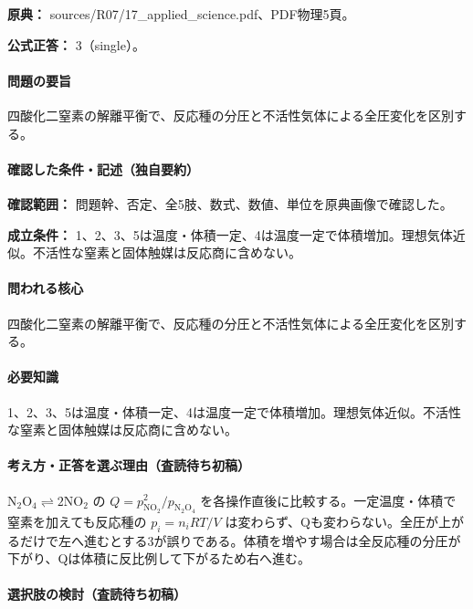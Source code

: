 \noindent\textbf{原典：} sources/R07/17\_applied\_science.pdf、PDF物理5頁。

\textbf{公式正答：} 3（single）。

\paragraph{問題の要旨} 四酸化二窒素の解離平衡で、反応種の分圧と不活性気体による全圧変化を区別する。

\paragraph{確認した条件・記述（独自要約）}\mbox{}\par

\noindent\textbf{確認範囲：} 問題幹、否定、全5肢、数式、数値、単位を原典画像で確認した。\par

\noindent\textbf{成立条件：} 1、2、3、5は温度・体積一定、4は温度一定で体積増加。理想気体近似。不活性な窒素と固体触媒は反応商に含めない。\par

\paragraph{問われる核心} 四酸化二窒素の解離平衡で、反応種の分圧と不活性気体による全圧変化を区別する。

\paragraph{必要知識} 1、2、3、5は温度・体積一定、4は温度一定で体積増加。理想気体近似。不活性な窒素と固体触媒は反応商に含めない。

\paragraph{考え方・正答を選ぶ理由（査読待ち初稿）} \(\mathrm{N_2O_4\rightleftharpoons2NO_2}\) の \(Q=p_{\mathrm{NO_2}}^2/p_{\mathrm{N_2O_4}}\) を各操作直後に比較する。一定温度・体積で窒素を加えても反応種の \(p_i=n_iRT/V\) は変わらず、Qも変わらない。全圧が上がるだけで左へ進むとする3が誤りである。体積を増やす場合は全反応種の分圧が下がり、Qは体積に反比例して下がるため右へ進む。

\paragraph{選択肢の検討（査読待ち初稿）}\mbox{}\par


